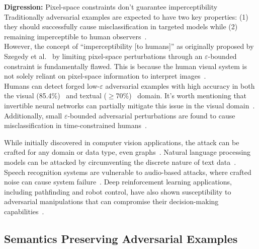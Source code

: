 \documentclass[a4paper, oneside]{discothesis}
\begin{document}
\begin{highlightbox}
	\textbf{Digression:} Pixel-space constraints don't guarantee imperceptibility \\

	Traditionally adversarial examples are expected to have two key properties: (1) they should successfully cause misclassification in targeted models while (2) remaining imperceptible to human observers~\cite{cubuk2017intriguing}. \\

	However, the concept of ``imperceptibility [to humans]'' as originally proposed by Szegedy et al.~\cite{szegedy2013intriguing} by limiting pixel-space perturbations through an $\varepsilon$-bounded constraint is fundamentally flawed. This is because the human visual system is not solely reliant on pixel-space information to interpret images~\cite{ning2023hflic}. \\

	Humans can detect forged low-$\varepsilon$ adversarial examples with high accuracy in both the visual (85.4\%)~\cite{veerabadran2023subtle} and textual ($\geq$70\%)~\cite{herel2023preserving} domain. It's worth mentioning that invertible neural networks can partially mitigate this issue in the visual domain~\cite{chen2023imperceptible}. \\
	
	Additionally, small $\varepsilon$-bounded adversarial perturbations are found to cause misclassification in time-constrained humans~\cite{elsayed2018adversarial}.
\end{highlightbox}

While initially discovered in computer vision applications, the attack can be crafted for any domain or data type, even graphs~\cite{Kashyap2024AdversarialAA}. Natural language processing models can be attacked by circumventing the discrete nature of text data~\cite{Han2022TextAA, meng2020geometry, yang2024assessing}. Speech recognition systems are vulnerable to audio-based attacks, where crafted noise can cause system failure~\cite{rajaratnam2018noise}. Deep reinforcement learning applications, including pathfinding and robot control, have also shown susceptibility to adversarial manipulations that can compromise their decision-making capabilities~\cite{Bai2018AdversarialEC}.

\subsection{Semantics Preserving Adversarial Examples}
\end{document}
